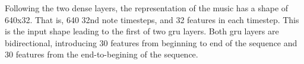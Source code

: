 
Following the two dense layers, the representation of the
music has a shape of 640x32. That is, 640 \gls{32nd} note
timesteps, and 32 features in each timestep. This is the
input shape leading to the first of two \gls{gru} layers.
Both \gls{gru} layers are bidirectional, introducing 30
features from beginning to end of the sequence and 30
features from the end-to-begining of the sequence.

